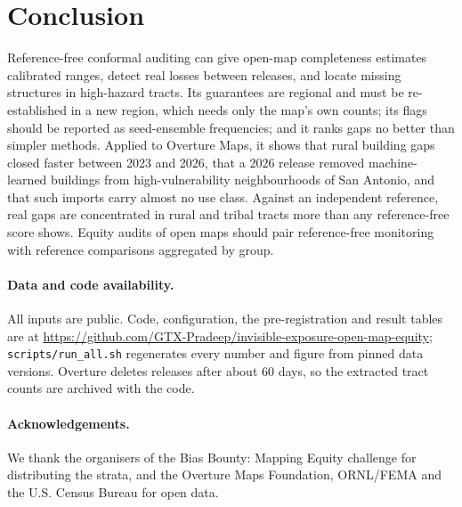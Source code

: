\documentclass[11pt]{article}
\begin{document}
\section{Conclusion}
Reference-free conformal auditing can give open-map completeness estimates calibrated ranges, detect real losses between releases, and locate missing structures in high-hazard tracts. Its guarantees are regional and must be re-established in a new region, which needs only the map's own counts; its flags should be reported as seed-ensemble frequencies; and it ranks gaps no better than simpler methods. Applied to Overture Maps, it shows that rural building gaps closed faster between 2023 and 2026, that a 2026 release removed machine-learned buildings from high-vulnerability neighbourhoods of San Antonio, and that such imports carry almost no use class. Against an independent reference, real gaps are concentrated in rural and tribal tracts more than any reference-free score shows. Equity audits of open maps should pair reference-free monitoring with reference comparisons aggregated by group.

\paragraph{Data and code availability.} All inputs are public. Code, configuration, the pre-registration and result tables are at \url{https://github.com/GTX-Pradeep/invisible-exposure-open-map-equity}; \texttt{scripts/run\_all.sh} regenerates every number and figure from pinned data versions. Overture deletes releases after about 60 days, so the extracted tract counts are archived with the code.

\paragraph{Acknowledgements.} We thank the organisers of the Bias Bounty: Mapping Equity challenge for distributing the strata, and the Overture Maps Foundation, ORNL/FEMA and the U.S. Census Bureau for open data.




\appendix
\end{document}
